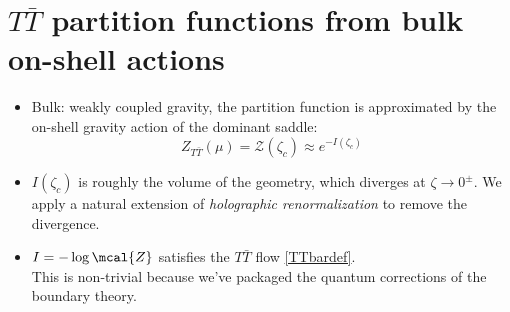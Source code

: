 \documentclass[10pt]{article}
\renewenvironment{frame}[1]%
	{\section*{#1}}%
	{\clearpage}
\newcommand{\pause}{}
\newenvironment{columns}%
	{\par\begin{minipage}{\textwidth}}%
	{\end{minipage}}
\newenvironment{column}[1]%
	{\begin{minipage}{#1}}%
	{\end{minipage}}
\newcommand{\TTbar}{\texorpdfstring{\ensuremath{T\bar{T}}}{TTbar}\xspace}
\begin{document}
\begin{frame}{\TTbar partition functions from bulk on-shell actions}{%
	\textcite{Caputa:2020lpa}
}
\begin{columns}
\figGlueon
\hspace{-1.5em}
\begin{column}{.6\textwidth}
\vspace{-.3\baselineskip}
\begin{itemize}
\item Bulk: weakly coupled gravity, the partition function is approximated by the on-shell gravity action of the dominant saddle:
	\begin{equation}
		Z_{T\bar T} (\mu) = \mathcal Z (\zeta_c) \approx  e^{-I(\zeta_c)}\label{partition2}
	\end{equation}

\pause
\item $I(\zeta_c)$ is roughly the volume of the geometry, which diverges at $\zeta \to 0^\pm$. We apply a natural extension of \textit{holographic renormalization} to remove the divergence.

\pause
\item $I = -\log \mcal{Z}$ satisfies the \TTbar flow \eqref{TTbardef}.\\
	This is non-trivial because we've packaged the quantum corrections of the boundary theory.
\end{itemize}
\end{column}
\end{columns}
\end{frame}
\end{document}
